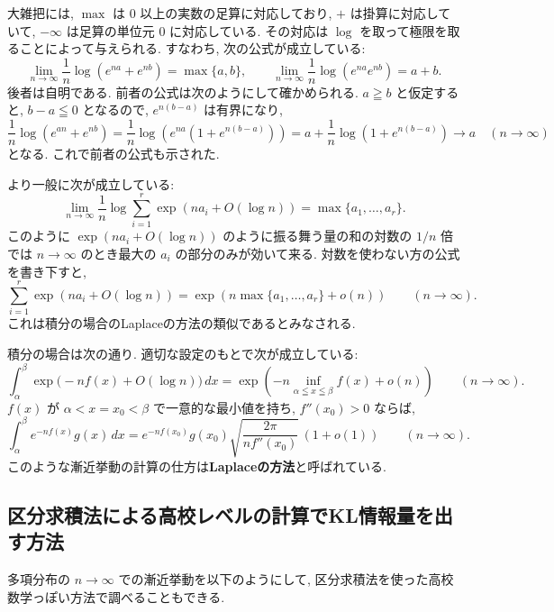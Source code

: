 \documentclass[12pt,twoside]{jarticle}
\theoremstyle{jplain}
\theoremstyle{jplain}
\theoremstyle{jplain}
\numberwithin{theorem}{section}
\numberwithin{equation}{section}
\numberwithin{figure}{section}
\numberwithin{table}{section}
\begin{document}
大雑把には, $\max$ は $0$ 以上の実数の足算に対応しており,
$+$ は掛算に対応していて, $-\infty$ は足算の単位元 $0$ に対応している.
その対応は $\log$ を取って極限を取ることによって与えられる.
すなわち, 次の公式が成立している:
\[
\lim_{n\to\infty}\frac{1}{n}\log(e^{na}+e^{nb})=\max\{a,b\}, \qquad
\lim_{n\to\infty}\frac{1}{n}\log(e^{na}e^{nb})=a+b.
\]
後者は自明である.
前者の公式は次のようにして確かめられる.
$a\geqq b$ と仮定すると, $b-a\leqq 0$ となるので,
$e^{n(b-a)}$ は有界になり,
\[
\frac{1}{n}\log(e^{an}+e^{nb})
=\frac{1}{n}\log\left(e^{na}\left(1+e^{n(b-a)}\right)\right)
=a+\frac{1}{n}\log\left(1+e^{n(b-a)}\right)
\to a
\quad (n\to\infty)
\]
となる. これで前者の公式も示された.

より一般に次が成立している:
\[
\lim_{n\to\infty}\frac{1}{n}\log\sum_{i=1}^r \exp(na_i+O(\log n))
= \max\{a_1,\ldots,a_r\}.
\]
このように $\exp(na_i+O(\log n))$ のように振る舞う量の和の対数の $1/n$ 倍では
$n\to\infty$ のとき最大の $a_i$ の部分のみが効いて来る.
対数を使わない方の公式を書き下すと,
\[
\sum_{i=1}^r \exp(na_i+O(\log n))
=
\exp(n\max\{a_1,\ldots,a_r\}+o(n))
\qquad
(n\to\infty).
\]
これは積分の場合のLaplaceの方法の類似であるとみなされる.

積分の場合は次の通り.
適切な設定のもとで次が成立している:
\[
\int_\alpha^\beta \exp\biggl(-nf(x)+O(\log n)\biggr)\,dx
=
\exp\left(-n\inf_{\alpha\leqq x\leqq\beta} f(x) + o(n)\right)
\qquad
(n\to\infty).
\]
$f(x)$ が $\alpha<x=x_0<\beta$ で一意的な最小値を持ち,
$f''(x_0)>0$ ならば,
\[
\int_\alpha^\beta e^{-nf(x)}g(x)\,dx
=
e^{-nf(x_0)}g(x_0)\sqrt{\frac{2\pi}{n f''(x_0)}}\,(1+o(1))
\qquad
(n\to\infty).
\]
このような漸近挙動の計算の仕方は{\bfseries Laplaceの方法}と呼ばれている.


\subsection{区分求積法による高校レベルの計算でKL情報量を出す方法}
\label{sec:quadrature-by-parts}

多項分布の $n\to\infty$ での漸近挙動を以下のようにして,
区分求積法を使った高校数学っぽい方法で調べることもできる.
\end{document}
